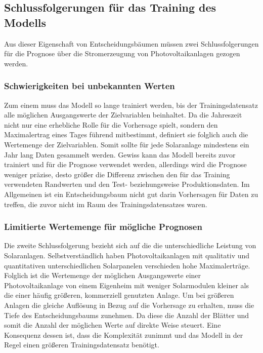\documentclass[12pt, a4paper]{article}
\begin{document}
\subsection{Schlussfolgerungen für das Training des Modells}

Aus dieser Eigenschaft von Entscheidungsbäumen müssen zwei Schlussfolgerungen für die Prognose über die Stromerzeugung von Photovoltaikanlagen gezogen werden. 

\subsubsection{Schwierigkeiten bei unbekannten Werten}

Zum einem muss das Modell so lange trainiert werden, bis der Trainingsdatensatz alle möglichen Ausgangswerte der Zielvariablen beinhaltet. Da die Jahreszeit nicht nur eine erhebliche Rolle für die Vorhersage spielt, sondern den Maximalertrag eines Tages führend mitbestimmt, definiert sie folglich auch die Wertemenge der Zielvariablen. Somit sollte für jede Solaranlage mindestens ein Jahr lang Daten gesammelt werden. Gewiss kann das Modell bereits zuvor trainiert und für die Prognose verwendet werden, allerdings wird die Prognose weniger präzise, desto größer die Differenz zwischen den für das Training verwendeten Randwerten und den Test- beziehungsweise Produktionsdaten. Im Allgemeinen ist ein Entscheidungsbaum nicht gut darin Vorhersagen für Daten zu treffen, die zuvor nicht im Raum des Trainingsdatensatzes waren.

\subsubsection{Limitierte Wertemenge für mögliche Prognosen}

Die zweite Schlussfolgerung bezieht sich auf die die unterschiedliche Leistung von Solaranlagen. Selbstverständlich haben Photovoltaikanlagen mit qualitativ und quantitativen unterschiedlichen Solarpanelen verschieden hohe Maximalerträge. Folglich ist die Wertemenge der möglichen Ausgangswerte einer Photovoltaikanlage von einem Eigenheim mit weniger Solarmodulen kleiner als die einer häufig größeren, kommerziell genutzten Anlage. Um bei größeren Anlagen die gleiche Auflösung in Bezug auf die Vorhersage zu erhalten, muss die Tiefe des Entscheidungsbaums zunehmen. Da diese die Anzahl der Blätter und somit die Anzahl der möglichen Werte auf direkte Weise steuert. Eine Konsequenz dessen ist, dass die Komplexität zunimmt und das Modell in der Regel einen größeren Trainingsdatensatz benötigt.
\end{document}
